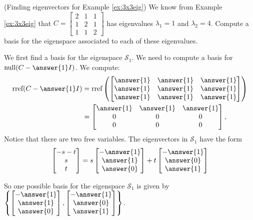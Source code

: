 \documentclass{ximera}
\begin{document}
\begin{example}\label{ex:eigvectors3x3eig} (Finding eigenvectors for Example \ref{ex:3x3eig})
    We know from Example \ref{ex:3x3eig} that $C=\begin{bmatrix} 2 & 1 & 1\\ 1 & 2 & 1\\ 1 & 1 & 2\end{bmatrix}$ has eigenvalues $\lambda_1=1$ and $\lambda_2=4$. Compute a basis for the eigenspace associated to each of these eigenvalues.
    \begin{explanation}
    We first find a basis for the eigenspace $\mathcal{S}_1$.  We need to compute a basis for $\mbox{null}(C-\answer{1}I)$.  We compute:
    \begin{align*}
    \mbox{rref}(C-\answer{1}I) &= \mbox{rref}\left(\begin{bmatrix} \answer{1} & \answer{1} & \answer{1}\\ \answer{1} & \answer{1} & \answer{1}\\ \answer{1} & \answer{1} & \answer{1}\end{bmatrix}\right) \\
    &= \begin{bmatrix} \answer{1} & \answer{1} & \answer{1}\\ 0 & 0 & 0\\ 0 & 0 & 0\end{bmatrix},
    \end{align*}
    Notice that there are two free variables. The eigenvectors in $\mathcal{S}_1$ have the form
    $$\begin{bmatrix}-s-t\\s\\t\end{bmatrix} = s\begin{bmatrix}-\answer{1}\\\answer{1}\\\answer{0}\end{bmatrix} + t\begin{bmatrix}-\answer{1}\\\answer{0}\\\answer{1}\end{bmatrix}$$
        
    So one possible basis for the eigenspace $\mathcal{S}_1$ is given by $\left\{\begin{bmatrix}-\answer{1}\\\answer{1}\\\answer{0}\end{bmatrix}, \begin{bmatrix}-\answer{1}\\\answer{0}\\\answer{1}\end{bmatrix}\right\}$.
        

\end{explanation}
\end{example}
\end{document}
